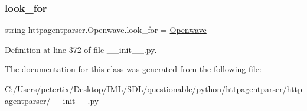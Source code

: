 \subsubsection{\texorpdfstring{look\+\_\+for}{look\_for}}
{\footnotesize\ttfamily string httpagentparser.\+Openwave.\+look\+\_\+for = \textquotesingle{}\hyperlink{classhttpagentparser_1_1_openwave}{Openwave}\textquotesingle{}\hspace{0.3cm}{\ttfamily [static]}}



Definition at line 372 of file \+\_\+\+\_\+init\+\_\+\+\_\+.\+py.



The documentation for this class was generated from the following file\+:\begin{DoxyCompactItemize}
\item 
C\+:/\+Users/petertix/\+Desktop/\+I\+M\+L/\+S\+D\+L/questionable/python/httpagentparser/httpagentparser/\hyperlink{____init_____8py}{\+\_\+\+\_\+init\+\_\+\+\_\+.\+py}\end{DoxyCompactItemize}
